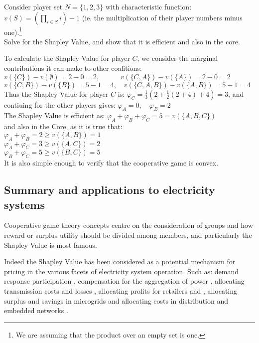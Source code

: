 \begin{example}
Consider player set $N=\{1,2,3\}$ with characteristic function:\\
$v(S)=\left(\prod_{i\in S}i\right)-1$ (ie. the multiplication of their player numbers minus one).\footnote{We are assuming that the product over an empty set is one.}\\
Solve for the Shapley Value, and show that it is efficient and also in the core.
\end{example}

\begin{solution}
To calculate the Shapley Value for player $C$, we consider the marginal contributions it can make to other coalitions:\\
$ v(\{C\})-v(\emptyset) = 2-0 = 2, \quad\quad\quad v(\{C,A\})-v(\{A\}) = 2-0 = 2$\\
$ v(\{C,B\})-v(\{B\}) = 5-1 = 4, \quad v(\{C,A,B\})-v(\{A,B\}) = 5-1 = 4  $\\
Thus the Shapley Value for player $C$ is:
$\varphi_C = \frac{1}{3}\left(2 + \frac{1}{2}(2+4) + 4\right) = 3$, and contiuing for the other players gives:
$\varphi_A = 0,\quad\varphi_B = 2$\\
The Shapley Value is efficient as: $\varphi_A+\varphi_B+\varphi_C = 5 = v(\{A,B,C\})$\\
and also in the Core, as it is true that:\\
$\varphi_A+\varphi_B=2\ge v(\{A,B\})=1$\\
$\varphi_A+\varphi_C=3\ge v(\{A,C\})=2$\\
$\varphi_B+\varphi_C=5\ge v(\{B,C\})=5$\\
It is also simple enough to verify that the cooperative game is convex.

\end{solution}

\subsection{Summary and applications to electricity systems}

Cooperative game theory concepts centre on the consideration of groups and how reward or surplus utility should be divided among members, and particularly the Shapley Value is most famous.

Indeed the Shapley Value has been considered as a potential mechanism for pricing in the various facets of electricity system operation.
Such as: demand response participation \citep{DBLP:journals/tsg/OBrienGR15,electronics8010048,WANG201972}, compensation for the aggregation of power \citep{Perez-Diaz:2018:CEV:3237383.3237484,6520960}, allocating transmission costs and losses \citep{ip-gtd_20020005,SHARMA201733}, allocating profits for retailers and \citep{ACUNA2018161,WANG201972}, allocating surplus and savings in microgrids \citep{WU2017384} and allocating costs in distribution and embedded networks \citep{archie_paper1,8226810,10.1007/978-3-642-40776-5_19,6840296,DBLP:journals/corr/abs-1903-10965,AzuatalamCV_PowerTech2019}.

